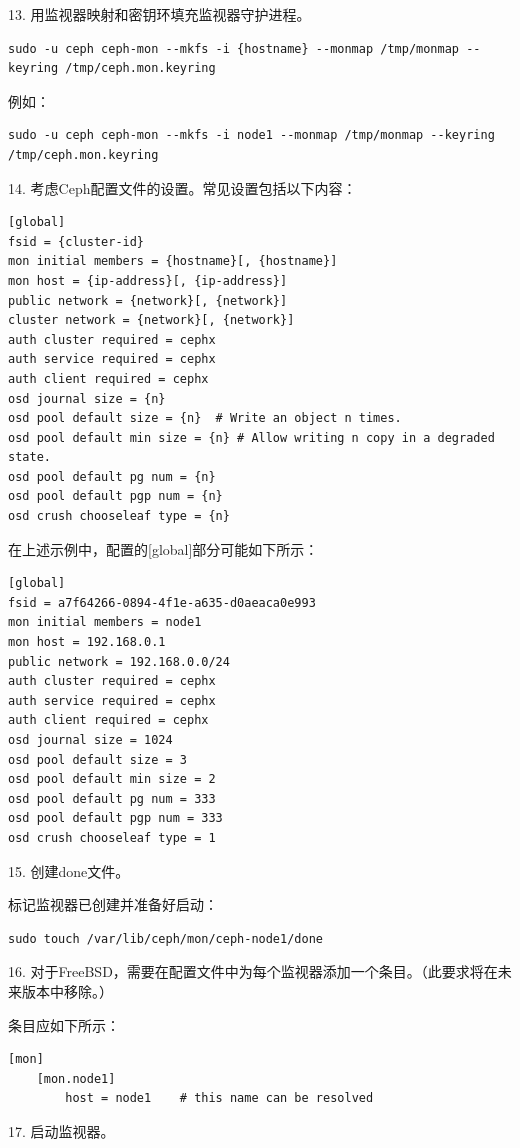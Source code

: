\documentclass[12pt,UTF8]{ctexbook}
\begin{document}
13. 用监视器映射和密钥环填充监视器守护进程。
\begin{verbatim}
sudo -u ceph ceph-mon --mkfs -i {hostname} --monmap /tmp/monmap --keyring /tmp/ceph.mon.keyring
\end{verbatim}

例如：
\begin{verbatim}
sudo -u ceph ceph-mon --mkfs -i node1 --monmap /tmp/monmap --keyring /tmp/ceph.mon.keyring
\end{verbatim}

14. 考虑Ceph配置文件的设置。常见设置包括以下内容：
\begin{verbatim}
[global]
fsid = {cluster-id}
mon initial members = {hostname}[, {hostname}]
mon host = {ip-address}[, {ip-address}]
public network = {network}[, {network}]
cluster network = {network}[, {network}]
auth cluster required = cephx
auth service required = cephx
auth client required = cephx
osd journal size = {n}
osd pool default size = {n}  # Write an object n times.
osd pool default min size = {n} # Allow writing n copy in a degraded state.
osd pool default pg num = {n}
osd pool default pgp num = {n}
osd crush chooseleaf type = {n}
\end{verbatim}

在上述示例中，配置的[global]部分可能如下所示：
\begin{verbatim}
[global]
fsid = a7f64266-0894-4f1e-a635-d0aeaca0e993
mon initial members = node1
mon host = 192.168.0.1
public network = 192.168.0.0/24
auth cluster required = cephx
auth service required = cephx
auth client required = cephx
osd journal size = 1024
osd pool default size = 3
osd pool default min size = 2
osd pool default pg num = 333
osd pool default pgp num = 333
osd crush chooseleaf type = 1
\end{verbatim}

15. 创建done文件。

标记监视器已创建并准备好启动：
\begin{verbatim}
sudo touch /var/lib/ceph/mon/ceph-node1/done
\end{verbatim}

16. 对于FreeBSD，需要在配置文件中为每个监视器添加一个条目。（此要求将在未来版本中移除。）

条目应如下所示：
\begin{verbatim}
[mon]
    [mon.node1]
        host = node1    # this name can be resolved
\end{verbatim}

17. 启动监视器。
\end{document}
